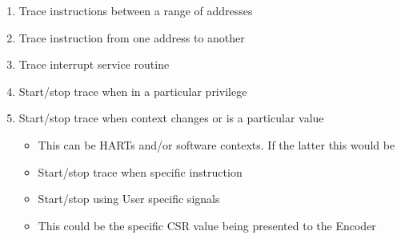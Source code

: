 \begin{enumerate}
  \item Trace instructions between a range of addresses
  \item Trace instruction from one address to another
  \item Trace interrupt service routine
  \item Start/stop trace when in a particular privilege 
  \item Start/stop trace when context changes or is a particular value
  \begin {itemize}
    \item This can be HARTs and/or software contexts. If the latter this would be 
    \item Start/stop trace when specific instruction
    \item Start/stop using User specific signals 
    \item This could be the specific CSR value being presented to the Encoder
  \end{itemize}
\end{enumerate}
